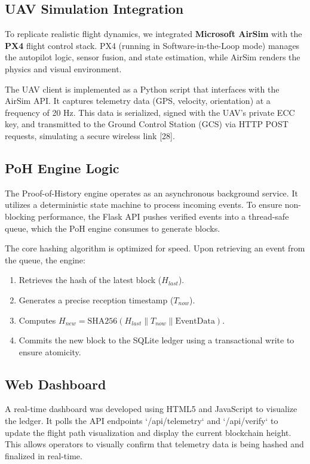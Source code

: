 \documentclass[preprint,12pt]{elsarticle}
\begin{document}
\subsection{UAV Simulation Integration}
To replicate realistic flight dynamics, we integrated \textbf{Microsoft AirSim} with the \textbf{PX4} flight control stack. PX4 (running in Software-in-the-Loop mode) manages the autopilot logic, sensor fusion, and state estimation, while AirSim renders the physics and visual environment.

The UAV client is implemented as a Python script that interfaces with the AirSim API. It captures telemetry data (GPS, velocity, orientation) at a frequency of 20 Hz. This data is serialized, signed with the UAV's private ECC key, and transmitted to the Ground Control Station (GCS) via HTTP POST requests, simulating a secure wireless link [28].

\subsection{PoH Engine Logic}
The Proof-of-History engine operates as an asynchronous background service. It utilizes a deterministic state machine to process incoming events. To ensure non-blocking performance, the Flask API pushes verified events into a thread-safe queue, which the PoH engine consumes to generate blocks.

The core hashing algorithm is optimized for speed. Upon retrieving an event from the queue, the engine:
\begin{enumerate}
    \item Retrieves the hash of the latest block ($H_{last}$).
    \item Generates a precise reception timestamp ($T_{now}$).
    \item Computes $H_{new} = \text{SHA256}(H_{last} \parallel T_{now} \parallel \text{EventData})$.
    \item Commits the new block to the SQLite ledger using a transactional write to ensure atomicity.
\end{enumerate}

\subsection{Web Dashboard}
A real-time dashboard was developed using HTML5 and JavaScript to visualize the ledger. It polls the API endpoints `/api/telemetry` and `/api/verify` to update the flight path visualization and display the current blockchain height. This allows operators to visually confirm that telemetry data is being hashed and finalized in real-time.
\end{document}
